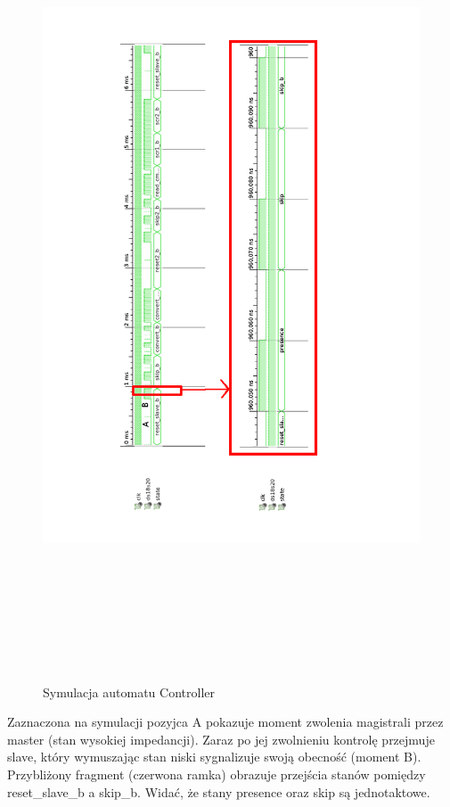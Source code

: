 \documentclass[a4paper]{article}
\begin{document}
\newpage

\begin{figure}[H]
\begin{center}
\includegraphics[height=24cm]{graphics/controller_symulation.png}
\end{center}
\caption{Symulacja automatu Controller}
\label{controller_symulation}
\end{figure}

Zaznaczona na symulacji pozyjca A pokazuje moment zwolenia magistrali przez master (stan wysokiej impedancji). Zaraz po jej zwolnieniu kontrolę przejmuje slave, który wymuszając stan niski sygnalizuje swoją obecność (moment B). Przybliżony fragment (czerwona ramka) obrazuje przejścia stanów pomiędzy reset\_slave\_b a skip\_b. Widać, że stany presence oraz skip są jednotaktowe. 
\end{document}
